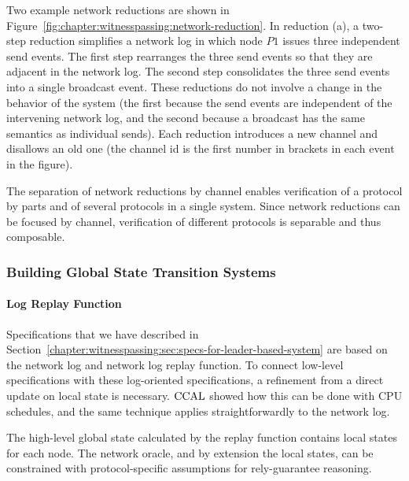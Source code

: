 Two example network reductions are shown in Figure~\ref{fig:chapter:witnesspassing:network-reduction}. In
reduction (a), a two-step reduction simplifies a network log in which node $P1$ issues three independent send events. The first step rearranges the three send
events so that they are adjacent in the network log. The second step
consolidates the three send events into a single broadcast event. These
reductions do not involve a change in the behavior of the system (the first because
the send events are independent of the intervening network log, and the second
because a broadcast has the same semantics as individual sends). Each reduction
introduces a new channel and disallows an old one (the channel id is the first
number in brackets in each event in the figure).

The separation of network reductions by channel enables verification of a
protocol by parts and of several protocols in a single system. Since network
reductions can be focused by channel, verification of different protocols is
separable and thus composable.


\subsubsection{Building Global State Transition Systems}

\paragraph{Log Replay Function}
Specifications that we have described in
 Section~\ref{chapter:witnesspassing:sec:specs-for-leader-based-system}
 are based on the network log and network
log replay function. To connect low-level specifications with these log-oriented
specifications, a refinement from a direct update on local state is necessary. 
 $\mathrm{CCAL}$  showed how this can
be done with CPU schedules, and the same technique applies straightforwardly to
the network log.

The high-level global state calculated by the replay function contains local
states for each node. The network oracle, and by extension the local states, can
be constrained with protocol-specific assumptions for rely-guarantee reasoning.
